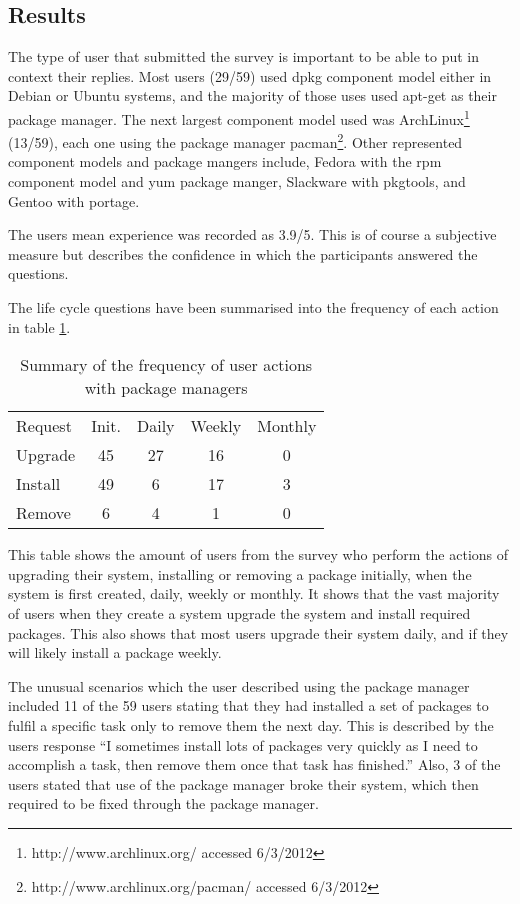 \subsection{Results}
The type of user that submitted the survey is important to be able to put in context their replies.
Most users (29/59) used dpkg component model either in Debian or Ubuntu systems, and the majority of those uses used apt-get as their package manager.
The next largest component model used was ArchLinux\footnote{http://www.archlinux.org/ accessed 6/3/2012} (13/59),
each one using the package manager pacman\footnote{http://www.archlinux.org/pacman/ accessed 6/3/2012}.
Other represented component models and package mangers include, Fedora with the rpm component model and yum package manger,
Slackware with pkgtools, and Gentoo with portage.

The users mean experience was recorded as 3.9/5.
This is of course a subjective measure but describes the confidence in which the participants answered the questions. 

The life cycle questions have been summarised into the frequency of each action in table \ref {strat.tblaction}.

\begin{table}[htp]
\begin{tabular}{l | c | c | c | c |}
Request & Init. & Daily & Weekly & Monthly \\
Upgrade  & 45 & 27 & 16 & 0 \\
Install & 49 & 6 & 17 & 3 \\
Remove & 6 & 4 & 1 & 0\\
\end{tabular}
\caption{Summary of the frequency of user actions with package managers}
\label{strat.tblaction}
\end{table}

This table shows the amount of users from the survey who perform the actions of upgrading their system, installing or removing a package 
initially, when the system is first created, daily, weekly or monthly.
It shows that the vast majority of users when they create a system upgrade the system and install required packages.
This also shows that most users upgrade their system daily, and if they will likely install a package weekly.

The unusual scenarios which the user described using the package manager included 
11 of the 59 users stating that they had installed a set of packages to fulfil a specific task only to remove them the next day.
This is described by the users response ``I sometimes install lots of packages very quickly as I need to accomplish a task, then remove them once that task has finished.''
Also, 3 of the users stated that use of the package manager broke their system, which then required to be fixed through the package manager.

